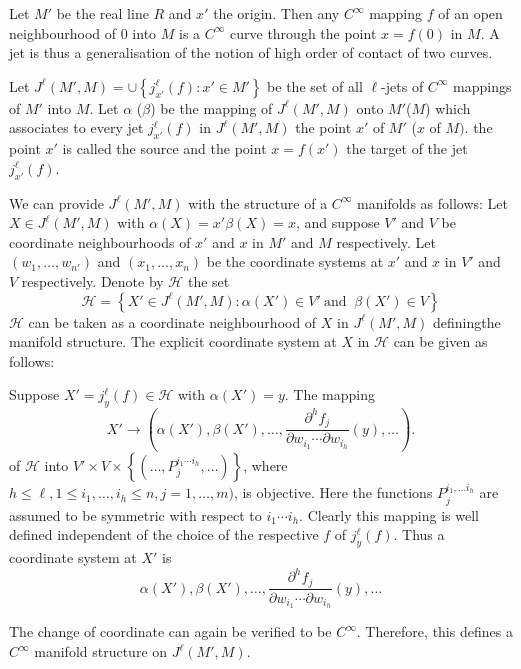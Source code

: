 \begin{example*}
  Let $M'$ be the real line $R$ and $x'$ the origin. Then any
  $C^\infty$ mapping $f$ of an open neighbourhood of $0$ into  $M$ is
  a $C^\infty$ curve through the point $x=  f(0)$ in $M$. A jet is
  thus a generalisation of the notion of high order of contact of two
  curves. 
\end{example*}  

Let $J^\ell (M',M)= \cup \left\{ j^\ell_{x'} (f): x' \in M' \right\}$
be the set of all $\ell$-jets of $C^\infty$ mappings of $M'$ into
$M$. Let $\alpha$ (\resp  $\beta$) be the mapping of $J^\ell (M', M)$
onto $M'$(\resp  $M$) which associates to every jet $j^{\ell}_{x'}(f)$
in $J^\ell (M', M)$ the point $x'$ of $M'$ (\resp  $x$ of $M)$. the
point $x'$ is called the source and the point $x=  f(x')$ the  target
of the jet $j^\ell_{x'}(f)$. 

We can provide $J^\ell(M',M)$ with the structure of a $C^\infty$
manifolds as follows: Let $X \in J^\ell(M', M)$ with $\alpha (X)= x'
\beta (X)=x$, and suppose $V'$ and $V$ be coordinate neighbourhoods of
$x'$ and $x$ in $M'$ and $M$ respectively. Let $(w_1,  \ldots ,
w_{n'})$ and $(x_1,  \ldots , x_n)$ be the coordinate systems at $x'$
and $x$ in $V'$ and $V$ respectively. Denote by $\mathscr{H}$ the set 
$$
\mathscr{H} = \left\{ X' \in J^\ell (M', M): \alpha (X') \in V' ~\text{
  and }~ \beta (X') \in V \right\} 
$$
$\mathscr{H}$ can be taken as a coordinate neighbourhood of $X$ in
$J^\ell (M', M)$  defining\pageoriginale  the manifold structure. The explicit
coordinate system at $X$ in $\mathscr{H}$ can be given as follows: 

Suppose $X'= j^\ell_y (f) \in \mathscr{H}$ with $\alpha (X') = y$. The mapping 
$$
X' \to \left( \alpha(X'), \beta (X'), \ldots ,\frac{\partial^h
  f_j}{\partial w_{i_1} \cdots \partial w_{i_h}} (y), \ldots \right). 
$$
of $\mathscr{H}$ into $V' \times V \times \left\{ ( \ldots ,P^{i_1
  \cdots i_h}_j  , \ldots) \right\}$, where $h \le \ell, 1 \le i_1,
\ldots , i_h \le n, j=1, \ldots , m)$, is objective. Here the
functions $P^{i_1,  \ldots i_h}_{j}$ are assumed to be symmetric with
respect to $i_1 \cdots i_h$. Clearly this mapping is well defined
independent of the choice of the respective $f$ of $j^{\ell}_y
(f)$. Thus a coordinate system at $X'$ is  
$$
\alpha (X') , \beta (X') , \ldots , \frac{\partial^h f_j}{\partial
  w_{i_1} \cdots \partial w_{i_h}} (y), \ldots  
$$
  
The change of coordinate can again be verified to be
$C^\infty$. Therefore, this defines a $C^\infty$ manifold structure on
$J^\ell(M',M)$. 
  
